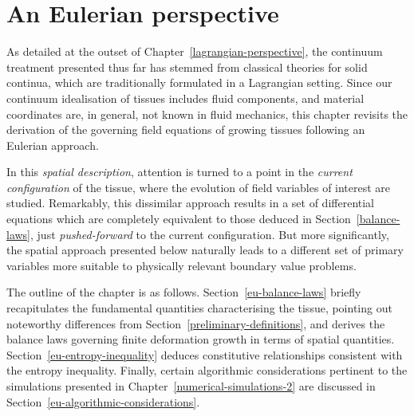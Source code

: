 

\chapter{An Eulerian perspective}
\label{eulerian-perspective}

As detailed at the outset of Chapter~\ref{lagrangian-perspective}, the
continuum treatment presented thus far has stemmed from classical
theories for solid continua, which are traditionally formulated in a
Lagrangian setting. Since our continuum idealisation of tissues
includes fluid components, and material coordinates are, in general,
not known in fluid mechanics, this chapter revisits the derivation of
the governing field equations of growing tissues following an Eulerian
approach.

In this {\em spatial description}, attention is turned to a point in
the {\em current configuration} of the tissue, where the evolution of
field variables of interest are studied. Remarkably, this dissimilar
approach results in a set of differential equations which are
completely equivalent to those deduced in Section~\ref{balance-laws},
just {\em pushed-forward} to the current configuration. But more
significantly, the spatial approach presented below naturally leads to
a different set of primary variables more suitable to physically
relevant boundary value problems.

The outline of the chapter is as
follows. Section~\ref{eu-balance-laws} briefly recapitulates the
fundamental quantities characterising the tissue, pointing out
noteworthy differences from Section~\ref{preliminary-definitions}, and
derives the balance laws governing finite deformation
growth in terms of spatial
quantities. Section~\ref{eu-entropy-inequality} deduces constitutive
relationships consistent with the entropy inequality. Finally, certain
algorithmic considerations pertinent to the simulations presented in
Chapter~\ref{numerical-simulations-2} are discussed in
Section~\ref{eu-algorithmic-considerations}.

